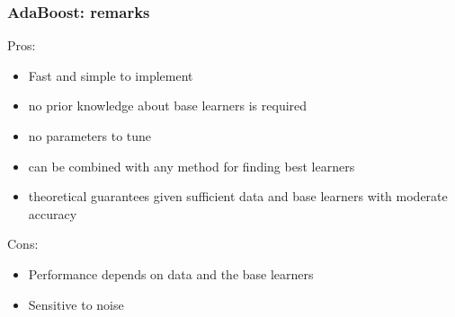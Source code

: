 \subsubsection{AdaBoost: remarks}
Pros:
\begin{itemize}
    \item Fast and simple to implement
    \item no prior knowledge about base learners is required
    \item no parameters to tune
    \item can be combined with any method for finding best learners
    \item theoretical guarantees given sufficient data and base learners with moderate accuracy
\end{itemize}
Cons:
\begin{itemize}
    \item Performance depends on data and the base learners
    \item Sensitive to noise
\end{itemize}

